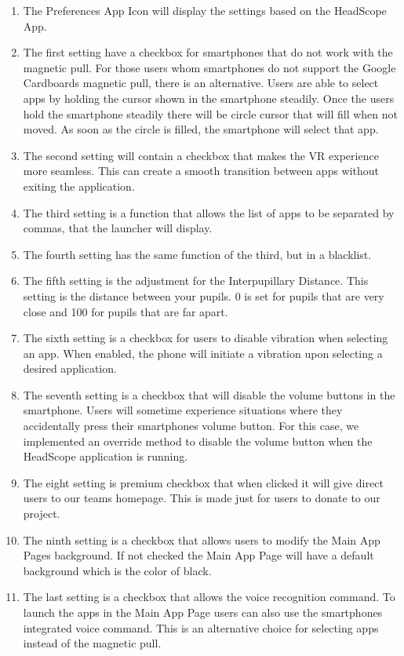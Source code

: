 \documentclass[12pt]{article}
\begin{document}
\begin{enumerate}
\item The Preferences App Icon will display the settings based on the HeadScope App.
\item The first setting have a checkbox for smartphones that do not work with the magnetic pull. For those users whom smartphones do not support the Google Cardboards magnetic pull, there is an alternative. Users are able to select apps by holding the cursor shown in the smartphone steadily. Once the users hold the smartphone steadily there will be circle cursor that will fill when not moved. As soon as the circle is filled, the smartphone will select that app.
\item The second setting will contain a checkbox that makes the VR experience more seamless. This can create a smooth transition between apps without exiting the application.
\item The third setting is a function that allows the list of apps to be separated by commas, that the launcher will display.
\item The fourth setting has the same function of the third, but in a blacklist.
\item The fifth setting is the adjustment for the Interpupillary Distance. This setting is the distance between your pupils. 0 is set for pupils that are very
close and 100 for pupils that are far apart.
\item The sixth setting is a checkbox for users to disable vibration when selecting an app. When enabled, the phone will initiate a vibration upon selecting a desired application.
\item The seventh setting is a checkbox that will disable the volume buttons in the smartphone. Users will sometime experience situations where they accidentally press their smartphones volume button. For this case, we implemented an override method to disable the volume button when the HeadScope application is running.
\item The eight setting is premium checkbox that when clicked it will give direct users to our teams homepage. This is made just for users to donate to our project.
\item The ninth setting is a checkbox that allows users to modify the Main App Pages background. If not checked the Main App Page will have a default background which is the color of black.
\item The last setting is a checkbox that allows the voice recognition command. To launch the apps in the Main App Page users can also use the smartphones integrated voice command. This is an alternative choice for selecting apps instead of the magnetic pull.
 
 
\end{enumerate}
\end{document}
